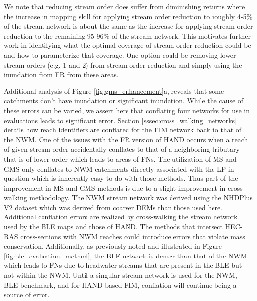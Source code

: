 \documentclass[draft]{dependencies/agujournal2019}
\begin{document}
We note that reducing stream order does suffer from diminishing returns where the increase in mapping skill for applying stream order reduction to roughly 4-5\% of the stream network is about the same as the increase for applying stream order reduction to the remaining 95-96\% of the stream network.
This motivates further work in identifying what the optimal coverage of stream order reduction could be and how to parameterize that coverage. 
One option could be removing lower stream orders (e.g. 1 and 2) from stream order reduction and simply using the inundation from FR from these areas.

Additional analysis of Figure \ref{fig:gms_enhancement}a, reveals that some catchments don't have inundation or significant inundation.
While the cause of these errors can be varied, we assert here that conflating four networks for use in evaluations leads to significant error.
Section \ref{sssec:cross_walking_networks} details how reach identifiers are conflated for the FIM network back to that of the NWM. 
One of the issues with the FR version of HAND occurs when a reach of given stream order accidentally conflates to that of a neighboring tributary that is of lower order which leads to areas of FNs.
The utilization of MS and GMS only conflates to NWM catchments directly associated with the LP in question which is inherently easy to do with those methods. 
Thus part of the improvement in MS and GMS methods is due to a slight improvement in cross-walking methodology.
The NWM stream network was derived using the NHDPlus V2 dataset which was derived from coarser DEMs than those used here. 
Additional conflation errors are realized by cross-walking the stream network used by the BLE maps and those of HAND.
The methods that intersect HEC-RAS cross-sections with NWM reaches could introduce errors that violate mass conservation.
Additionally, as previously noted and illustrated in Figure \ref{fig:ble_evaluation_method}, the BLE network is denser than that of the NWM which leads to FNs due to headwater streams that are present in the BLE but not within the NWM.
Until a singular stream network is used for the NWM, BLE benchmark, and for HAND based FIM, conflation will continue being a source of error.
\end{document}
